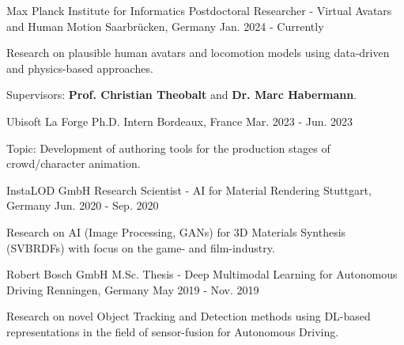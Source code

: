 

\begin{cventries}

\cventry
  {Max Planck Institute for Informatics} %
  {Postdoctoral Researcher - Virtual Avatars and Human Motion} %
  {Saarbrücken, Germany} %
  {Jan. 2024 - Currently} %
  {
    \begin{cvitems} %
      \item {Research on plausible human avatars and locomotion models using data-driven and physics-based approaches.}
      \item {Supervisors: \textbf{Prof. Christian Theobalt} and \textbf{Dr. Marc Habermann}.}
    \end{cvitems}
  }

  \cventry
    {Ubisoft La Forge} %
    {Ph.D. Intern} %
    {Bordeaux, France} %
    {Mar. 2023 - Jun. 2023} %
    {
      \begin{cvitems} %
        \item {Topic: Development of authoring tools for the production stages of crowd/character animation.}
      \end{cvitems}
    }

\cventry
    {InstaLOD GmbH} %
    {Research Scientist - AI for Material Rendering} %
    {Stuttgart, Germany} %
    {Jun. 2020 - Sep. 2020} %
    {
      \begin{cvitems} %
        \item {Research on AI (Image Processing, GANs) for 3D Materials Synthesis (SVBRDFs) with focus on the game- and film-industry.}
      \end{cvitems}
    }

\cventry
    {Robert Bosch GmbH} %
    {M.Sc. Thesis - Deep Multimodal Learning for Autonomous Driving} %
    {Renningen, Germany} %
    {May 2019 - Nov. 2019} %
    {
      \begin{cvitems} %
        \item {Research on novel Object Tracking and Detection methods using DL-based representations in the field of sensor-fusion for Autonomous Driving.}
      \end{cvitems}
    }


\end{cventries}
